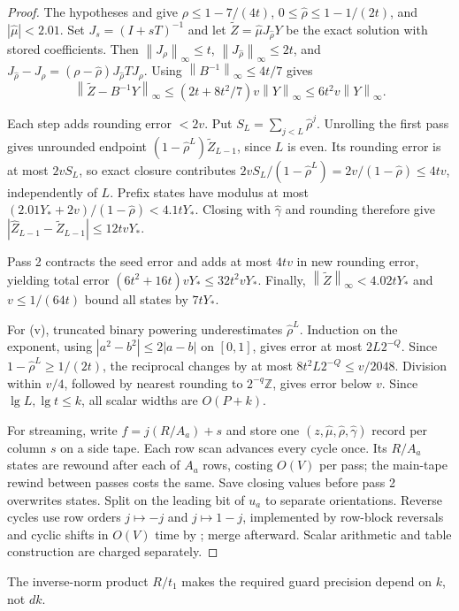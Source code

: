 \documentclass[11pt]{article}
\theoremstyle{definition}
\newcommand{\Z}{\mathbb{Z}}
\newcommand{\norm}[1]{\left\lVert #1 \right\rVert}
\newcommand{\abs}[1]{\left\lvert #1 \right\rvert}
\begin{document}
\begin{proof}
The hypotheses and  give
$\rho\le1-7/(4t)$, $0\le\hat\rho\le1-1/(2t)$, and $\abs{\hat\mu}<2.01$.
Set $J_s=(I+sT)^{-1}$ and let $\widetilde Z=\hat\mu J_{\hat\rho}Y$
be the exact solution with stored coefficients.
Then $\norm{J_\rho}_\infty\le t$, $\norm{J_{\hat\rho}}_\infty\le2t$, and
$J_{\hat\rho}-J_\rho=(\rho-\hat\rho)J_{\hat\rho}TJ_\rho$.
Using $\norm{B^{-1}}_\infty\le4t/7$ gives
\[
 \norm{\widetilde Z-B^{-1}Y}_\infty
 \le(2t+8t^2/7)v\norm{Y}_\infty
 \le6t^2v\norm{Y}_\infty.
\]

Each step adds rounding error $<2v$.
Put $S_L=\sum_{j<L}\hat\rho^j$.
Unrolling the first pass gives unrounded endpoint
$(1-\hat\rho^L)\widetilde Z_{L-1}$, since $L$ is even.
Its rounding error is at most $2vS_L$, so exact closure contributes
$2vS_L/(1-\hat\rho^L)=2v/(1-\hat\rho)\le4tv$, independently of $L$.
Prefix states have modulus at most
$(2.01Y_*+2v)/(1-\hat\rho)<4.1tY_*$.
Closing with $\hat\gamma$ and rounding therefore give
$\abs{\widehat Z_{L-1}-\widetilde Z_{L-1}}\le12tvY_*$.

Pass 2 contracts the seed error and adds at most $4tv$ in new rounding error,
yielding total error $(6t^2+16t)vY_*\le32t^2vY_*$.
Finally, $\norm{\widetilde Z}_\infty<4.02tY_*$ and $v\le1/(64t)$
bound all states by $7tY_*$.

For (v), truncated binary powering underestimates $\hat\rho^L$.
Induction on the exponent, using
$\abs{a^2-b^2}\le2\abs{a-b}$ on $[0,1]$, gives error at most $2L2^{-Q}$.
Since $1-\hat\rho^L\ge1/(2t)$, the reciprocal changes by at most
$8t^2L2^{-Q}\le v/2048$.
Division within $v/4$, followed by nearest rounding to $2^{-q}\Z$,
gives error below $v$.
Since $\lg L,\lg t\le k$, all scalar widths are $O(P+k)$.

For streaming, write $f=j(R/A_a)+s$ and store one
$(z,\hat\mu,\hat\rho,\hat\gamma)$ record per column $s$ on a side tape.
Each row scan advances every cycle once.
Its $R/A_a$ states are rewound after each of $A_a$ rows, costing $O(V)$
per pass; the main-tape rewind between passes costs the same.
Save closing values before pass 2 overwrites states.
Split on the leading bit of $u_a$ to separate orientations.
Reverse cycles use row orders $j\mapsto-j$ and $j\mapsto1-j$, implemented
by row-block reversals and cyclic shifts in $O(V)$ time by
; merge afterward.
Scalar arithmetic and table construction are charged separately.
\end{proof}

The inverse-norm product $R/t_1$ makes the required guard precision depend
on $k$, not $dk$.
\end{document}
